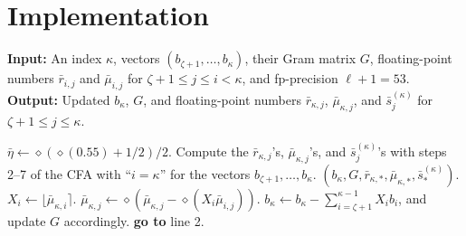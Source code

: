 \section{Implementation}


\begin{algorithm}
\caption{\textsf{LazySizeReduce}$(\kappa,\zeta,(b_1,\dots,b_d),G,\bar r,\bar\mu)$~\cite[Figure~5]{NS09}}
\label{alg:lazy-size-reduction}
\begin{algorithmic}[1]
  \Statex \textbf{Input:} An index $\kappa$, vectors
  $(b_{\zeta+1},\dots,b_\kappa)$, their Gram matrix $G$, floating-point numbers
  $\bar r_{i,j}$ and $\bar\mu_{i,j}$ for $\zeta+1\le j\le i<\kappa$,
  and fp-precision $\ell+1=53$.
  \Statex \textbf{Output:} Updated $b_\kappa$, $G$, and floating-point numbers
  $\bar r_{\kappa,j}$, $\bar\mu_{\kappa,j}$, and
  $\bar s^{(\kappa)}_j$ for $\zeta+1\le j\le \kappa$.

  \State $\bar\eta \gets \diamond(\diamond(0.55)+1/2)/2$.
  \State Compute the $\bar r_{\kappa,j}$'s, $\bar\mu_{\kappa,j}$'s, and
  $\bar s^{(\kappa)}_j$'s with steps 2--7 of the CFA with ``$i=\kappa$''
  for the vectors $b_{\zeta+1},\dots,b_\kappa$.
    \State \Return $(b_\kappa,G,\bar r_{\kappa,*},\bar\mu_{\kappa,*},\bar s^{(\kappa)}_*)$.
  \Else
      \State $X_i \gets \lfloor \bar\mu_{\kappa,i}\rceil$.
        \State $\bar\mu_{\kappa,j}\gets
        \diamond\!\left(\bar\mu_{\kappa,j}
        -\diamond(X_i\bar\mu_{i,j})\right)$.
      \EndFor
    \EndFor
    \State $b_\kappa \gets b_\kappa-\sum_{i=\zeta+1}^{\kappa-1}X_i b_i$,
    and update $G$ accordingly.
    \State \textbf{go to} line 2.
  \EndIf
\end{algorithmic}
\end{algorithm}


